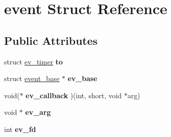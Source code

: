 \hypertarget{structevent}{\section{event Struct Reference}
\label{structevent}
}
\subsection*{Public Attributes}
\begin{DoxyCompactItemize}
\item 
\hypertarget{structevent_afb12f15ae9d3dc8a1ddeef66f24cc7ee}{\begin{tabbing}
xx\=xx\=xx\=xx\=xx\=xx\=xx\=xx\=xx\=\kill
union \{\\
\hypertarget{unionevent_1_1@17_a4482664f6cd2b8cd850bc64a4ed0521b}{\>struct \hyperlink{structev__io}{ev\_io} {\bfseries io}\\
\hypertarget{unionevent_1_1@17_a3bb994cc01a0b5cf5fad45a0c5c90e08}{\>struct \hyperlink{structev__signal}{ev\_signal} {\bfseries sig}\\
\} {\bfseries iosig}}\label{structevent_afb12f15ae9d3dc8a1ddeef66f24cc7ee}
\\

\end{tabbing}\item 
\hypertarget{structevent_a2bc71ca847b882aa99871e53e98769bd}{struct \hyperlink{structev__timer}{ev\-\_\-timer} {\bfseries to}}\label{structevent_a2bc71ca847b882aa99871e53e98769bd}

\item 
\hypertarget{structevent_ad0ca55c90047d869af935d02b6bf98d3}{struct \hyperlink{structevent__base}{event\-\_\-base} $\ast$ {\bfseries ev\-\_\-base}}\label{structevent_ad0ca55c90047d869af935d02b6bf98d3}

\item 
\hypertarget{structevent_a4d72069e453b5ed9cbfdc75913ff3088}{void($\ast$ {\bfseries ev\-\_\-callback} )(int, short, void $\ast$arg)}\label{structevent_a4d72069e453b5ed9cbfdc75913ff3088}

\item 
\hypertarget{structevent_a73daed0b06adc2661c2bb5cac36b6d72}{void $\ast$ {\bfseries ev\-\_\-arg}}\label{structevent_a73daed0b06adc2661c2bb5cac36b6d72}

\item 
\hypertarget{structevent_ac4e9ba9d79228d625bd80d441df1b6ef}{int {\bfseries ev\-\_\-fd}}\label{structevent_ac4e9ba9d79228d625bd80d441df1b6ef}

}
\end{DoxyCompactItemize}
